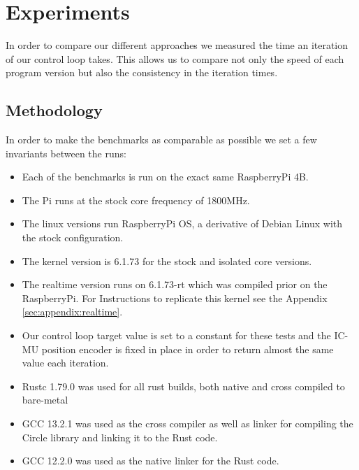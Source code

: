 \chapter{Experiments}
\label{chap:experiments}

In order to compare our different approaches we measured the time an iteration of our control loop takes.
This allows us to compare not only the speed of each program version but also the consistency in the iteration times.

\section{Methodology}
\label{sec:experiments:methodology}

In order to make the benchmarks as comparable as possible we set a few invariants between the runs:
\begin{itemize}
  \item Each of the benchmarks is run on the exact same RaspberryPi 4B.
  \item The Pi runs at the stock core frequency of 1800MHz.
  \item The linux versions run RaspberryPi OS, a derivative of Debian Linux with the stock configuration.
  \item The kernel version is 6.1.73 for the stock and isolated core versions.
  \item The realtime version runs on 6.1.73-rt which was compiled prior on the RaspberryPi. For Instructions to replicate this kernel see the Appendix \ref{sec:appendix:realtime}.
  \item Our control loop target value is set to a constant for these tests and the IC-MU position encoder is fixed in place in order to return almost the same value each iteration.
  \item Rustc 1.79.0 was used for all rust builds, both native and cross compiled to bare-metal
  \item GCC 13.2.1 was used as the cross compiler as well as linker for compiling the Circle library and linking it to the Rust code.
  \item GCC 12.2.0 was used as the native linker for the Rust code.
\end{itemize}

